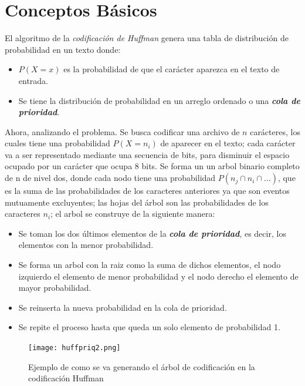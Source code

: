 \documentclass[12pt,twoside]{article}
\begin{document}
\section{Conceptos B\'asicos}

El algoritmo de la \textit{codificaci\'on de Huffman} genera una tabla de distribuci\'on de probabilidad en un texto donde:

\begin{itemize}
    \item $P( X = x )$ es la probabilidad de que el car\'acter aparezca en el texto de entrada.
    \item Se tiene la distribuci\'on de probabilidad en un arreglo ordenado o una \textit{\textbf{cola de prioridad}}.
\end{itemize}

Ahora, analizando el problema. Se busca codificar una archivo de $n$ car\'acteres, los cuales tiene una probabilidad $P(X=n_i)$ de aparecer en el texto; cada car\'acter va a ser representado mediante una secuencia de bits, para disminuir el espacio ocupado por un car\'acter que ocupa 8 bits. Se forma un un arbol binario completo de n de nivel dos, donde cada nodo tiene una probabilidad $P(n_j \cap n_i \cap \dots )$, que es la suma de las probabilidades de los caracteres anteriores ya que son eventos mutuamente excluyentes; las hojas del \'arbol son las probabilidades de los caracteres $n_i$; el arbol se construye de la siguiente manera:

\begin{itemize}
    \item Se toman los dos \'ultimos elementos de la \textit{\textbf{cola de prioridad}}, es decir, los elementos con la menor probabilidad.
    \item Se forma un arbol con la raiz como la suma de dichos elementos, el nodo izquierdo el elemento de menor probabilidad y el nodo derecho el elemento de mayor probabilidad.
    \item Se reinserta la nueva probabilidad en la cola de prioridad.
    \item Se repite el proceso hasta que queda un solo elemento de probabilidad 1.
\end{itemize}

\begin{figure}[ht]
    \centering
    \texttt{[image: huffpriq2.png]}
    \caption{Ejemplo de como se va generando el \'arbol de codificaci\'on en la codificaci\'on Huffman}
    \label{fig:ej_arbol}
\end{figure}
\end{document}
